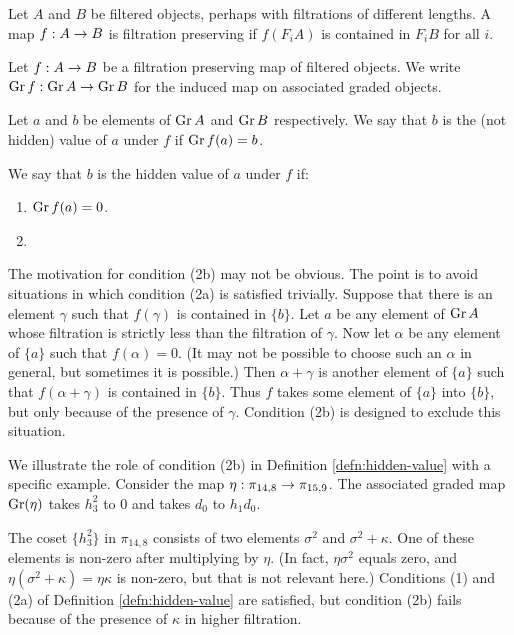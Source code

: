 \begin{defn}
Let $A$ and $B$ be filtered objects, perhaps with filtrations
of different lengths.
A map $f:A \rightarrow B$ is filtration preserving if
$f(F_i A)$ is contained in $F_i B$ for all $i$.
\end{defn}

Let $f: A \rightarrow B$ be a filtration preserving map of filtered objects.
We write $\operatorname{Gr} f: \operatorname{Gr} A \rightarrow \operatorname{Gr} B$ for the induced
map on associated graded objects.



\begin{defn}
\label{defn:hidden-value}
Let $a$ and $b$ be elements of $\operatorname{Gr} A$ and $\operatorname{Gr} B$ respectively.
We say that $b$ is the (not hidden) value of $a$ under $f$ if
$\operatorname{Gr} f(a) = b$.

We say that $b$ is the hidden value of $a$ under $f$ if:
\begin{enumerate}
\item
$\operatorname{Gr} f (a) = 0$.
\item
{}
\end{enumerate}
\end{defn}

The motivation for condition (2b) may not be obvious.
The point is to avoid situations in which condition (2a) is satisfied
trivially.
Suppose that 
there is an element $\gamma$ 
such that $f(\gamma)$ is contained in $\{b\}$.
Let $a$ be any element of $\operatorname{Gr} A$ 
whose filtration is strictly less than the filtration of $\gamma$.
Now let $\alpha$ be any element of $\{ a\}$ such that $f(\alpha) = 0$.
(It may not be possible to choose such an $\alpha$ in general,
but sometimes it is possible.)
Then $\alpha + \gamma$ is another element
of $\{a\}$ such that $f(\alpha + \gamma)$ is contained in $\{b\}$.
Thus $f$ takes some element of $\{a\}$ into $\{b\}$, but only because
of the presence of $\gamma$.  
Condition (2b) is designed to exclude
this situation.

\begin{ex}
\label{ex:14,8-hidden-defn}
We illustrate the role of condition (2b) 
in Definition \ref{defn:hidden-value} with a specific example.
Consider the map $\eta: \pi_{14,8} \rightarrow \pi_{15,9}$.
The associated graded map $\operatorname{Gr}(\eta)$ takes $h_3^2$ to $0$ and 
takes $d_0$ to $h_1 d_0$.

The coset $\{h_3^2\}$ in $\pi_{14,8}$ consists of two elements
$\sigma^2$ and $\sigma^2 + \kappa$.  
One of these elements is non-zero after multiplying by $\eta$.
(In fact, $\eta \sigma^2$ equals zero, and 
$\eta (\sigma^2 + \kappa) = \eta \kappa$ is non-zero, but
that is not relevant here.)
Conditions (1) and (2a) of Definition \ref{defn:hidden-value}
are satisfied, but condition (2b) fails because of the presence
of $\kappa$ in higher filtration.
\end{ex}

